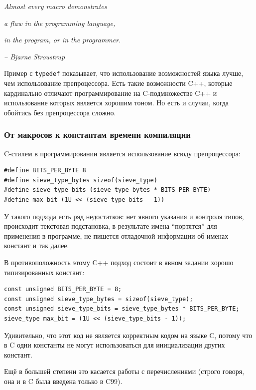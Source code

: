 \documentclass[a4paper,12pt,oneside]{article}
\begin{document}
\hfill\textit{Almost every macro demonstrates}

\hfill\textit{a flaw in the programming language,}

\hfill\textit{in the program, or in the programmer.}{\vspace{0.5em}}

\hfill\textit{-- Bjarne Stroustrup}

Пример с \lstinline!typedef! показывает, что использование возможностей языка лучше, чем использование препроцессора. Есть такие возможности C++, которые кардинально отличают программирование на C-подмножестве C++ и использование которых является хорошим тоном. Но есть и случаи, когда обойтись без препроцессора сложно.

\subsubsection{От макросов к константам времени компиляции}\label{ConstVsDef}

C-стилем в программировании является использование всюду препроцессора:

\begin{lstlisting}
#define BITS_PER_BYTE 8
#define sieve_type_bytes sizeof(sieve_type)
#define sieve_type_bits (sieve_type_bytes * BITS_PER_BYTE)
#define max_bit (1U << (sieve_type_bits - 1))
\end{lstlisting}

У такого подхода есть ряд недостатков: нет явного указания и контроля типов, происходит текстовая подстановка, в результате имена ``портятся'' для применения в программе, не пишется отладочной информации об именах констант и так далее.

В противоположность этому C++ подход состоит в явном задании хорошо типизированных констант:

\begin{lstlisting}
const unsigned BITS_PER_BYTE = 8;
const unsigned sieve_type_bytes = sizeof(sieve_type);
const unsigned sieve_type_bits = sieve_type_bytes * BITS_PER_BYTE;
sieve_type max_bit = (1U << (sieve_type_bits - 1));
\end{lstlisting}

Удивительно, что этот код не является корректным кодом на языке C, потому что в C одни константы не могут использоваться для инициализации других констант.

Ещё в большей степени это касается работы с перечислениями (строго говоря, она и в C была введена только в C99).
\end{document}

